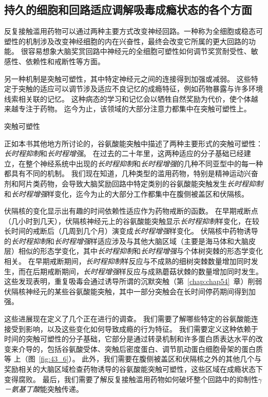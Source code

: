 \subsection{持久的细胞和回路适应调解吸毒成瘾状态的各个方面}

反复接触滥用药物可以通过两种主要方式改变神经回路。一种称为全细胞或稳态可塑性的机制涉及改变神经细胞的内在兴奋性，最终会改变它所属的更大回路的功能。
很容易想象大脑奖赏回路中神经元的全细胞可塑性如何调节奖赏耐受性、敏感性、依赖性和戒断性等方面。


另一种机制是突触可塑性，其中特定神经元之间的连接得到加强或减弱。
这些特定于突触的适应可以调节涉及适应不良记忆的成瘾特征，例如药物暴露与许多环境线索相关联的记忆。
这种病态的学习和记忆会以牺牲自然奖励为代价，使个体越来越专注于药物。
迄今为止，该领域的大部分注意力都集中在突触可塑性上。


突触可塑性

正如本书其他地方所讨论的，谷氨酸能突触中描述了两种主要形式的突触可塑性：
\textit{长时程抑制}和\textit{长时程增强}。
在过去的二十年里，这两种适应的分子基础已经建立，在整个神经系统中出现的\textit{长时程抑制}和\textit{长时程增强}的几种不同亚型中的每一种都具有不同的机制。
我们现在知道，几种类型的滥用药物，特别是精神运动兴奋剂和阿片类药物，会导致大脑奖励回路中特定类别的谷氨酸能突触发生\textit{长时程抑制}和\textit{长时程增强}样变化，迄今为止的大部分工作都集中在腹侧被盖区和伏隔核。


伏隔核的变化显示出有趣的时间依赖性适应作为药物戒断的函数。
在早期戒断点（几小时到几天），伏隔核神经元上的谷氨酸能突触显示\textit{长时程抑制}样变化，在较长时间的戒断后（几周到几个月）演变成\textit{长时程增强}样变化。
伏隔核中药物诱导的\textit{长时程抑制}和\textit{长时程增强}样适应涉及与其他大脑区域（主要是海马体和大脑皮层）相似的形态学变化，其中\textit{长时程抑制}和\textit{长时程增强}与个体树突棘的形态学变化相关。
在早期戒断期间，\textit{长时程抑制}样反应与不成熟的细树突棘数量增加同时发生，而在后期戒断期间，\textit{长时程增强}样反应与成熟蘑菇状棘的数量增加同时发生。
这些发现表明，重复吸毒会通过诱导所谓的沉默突触（第~\ref{chap:chap54}~章）削弱伏隔核神经元的某些谷氨酸能突触，其中一部分突触会在长时间停药期间得到加强。


这些进展现在定义了几个正在进行的调查。
我们需要了解哪些特定的谷氨酸能连接受到影响，以及这些变化如何导致成瘾的行为特征。
我们需要定义这种依赖于时间的突触可塑性的分子基础，它部分是通过转录机制和许多蛋白质表达水平的改变来介导的，包括谷氨酸受体、突触后密度蛋白、调节肌动蛋白细胞骨架的蛋白质等 上（图~\ref{fig:43_6}）。
此外，我们需要在腹侧被盖区和伏隔核之外的其他几个与奖励相关的大脑区域检查药物诱导的谷氨酸能突触可塑性，这些区域在成瘾状态下变得腐败。
最后，我们需要了解反复接触滥用药物如何破坏整个回路中的抑制性\textit{$\gamma$－氨基丁酸}能突触传递。


